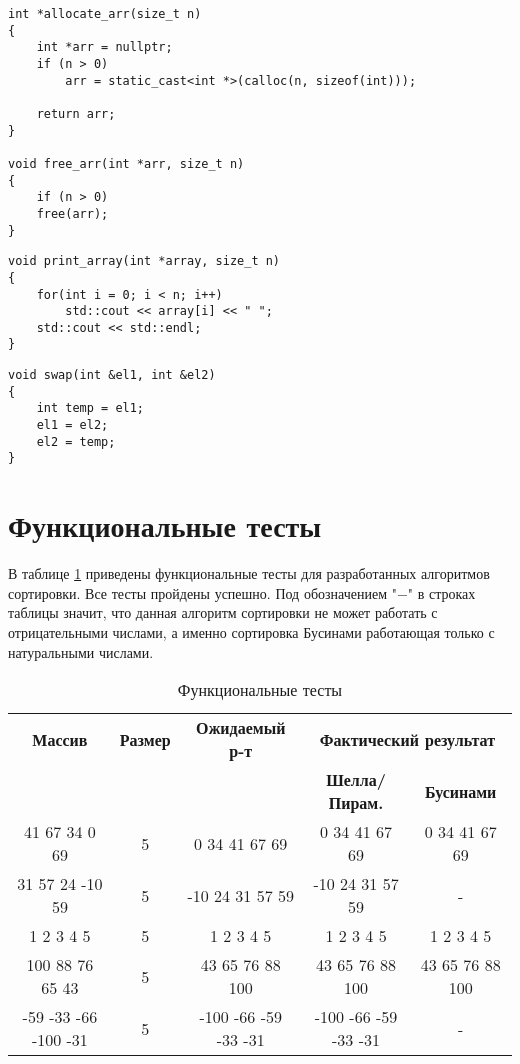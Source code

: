 \clearpage

\begin{lstlisting}[label=lst:allocate,caption=Функции выделение и освобождение памяти под массив]
int *allocate_arr(size_t n)
{
	int *arr = nullptr;
	if (n > 0)
		arr = static_cast<int *>(calloc(n, sizeof(int)));
	
	return arr;
}

void free_arr(int *arr, size_t n)
{
	if (n > 0)
	free(arr);
}
\end{lstlisting}

\begin{lstlisting}[label=lst:print,caption=Функция вывода print\_arr]
void print_array(int *array, size_t n)
{
	for(int i = 0; i < n; i++)
		std::cout << array[i] << " ";
	std::cout << std::endl;
}
\end{lstlisting}

\begin{lstlisting}[label=lst:swap,caption=Функция перестановки элементов места swap]
void swap(int &el1, int &el2)
{
	int temp = el1;
	el1 = el2;
	el2 = temp;
}
\end{lstlisting}

\clearpage

\section{Функциональные тесты}

В таблице \ref{tbl:func_tests} приведены функциональные тесты для разработанных алгоритмов сортировки. Все тесты пройдены успешно.
Под обозначением "$-$" \newline в строках таблицы значит, что данная алгоритм сортировки не может работать с отрицательными числами, а именно сортировка Бусинами работающая только с натуральными числами.

\begin{table}[ht]
	\small
	\begin{center}
		\begin{threeparttable}
		\caption{Функциональные тесты}
		\label{tbl:func_tests}
		\begin{tabular}{|c|c|c|c|c|}
			\hline
			\bfseries Массив
			& \bfseries Размер
			& \bfseries Ожидаемый р-т
			& \multicolumn{2}{c|}{\bfseries Фактический результат} \\ \cline{4-5}
			& & & \bfseries Шелла/Пирам. & \bfseries Бусинами \\
			\hline
			41 67 34 0 69 & 5 & 0 34 41 67 69 & 0 34 41 67 69 & 0 34 41 67 69 \\
			\hline
			31 57 24 -10 59 & 5 & -10 24 31 57 59 & -10 24 31 57 59 & - \\
			\hline
			1 2 3 4 5 & 5 & 1 2 3 4 5 & 1 2 3 4 5 & 1 2 3 4 5 \\
			\hline
			100 88 76 65 43 & 5 & 43 65 76 88 100 & 43 65 76 88 100 & 43 65 76 88 100 \\
			\hline
			-59 -33 -66 -100 -31 & 5 & -100 -66 -59 -33 -31 & -100 -66 -59 -33 -31 & - \\
			\hline
		\end{tabular}	
		\end{threeparttable}	
	\end{center}
\end{table}

